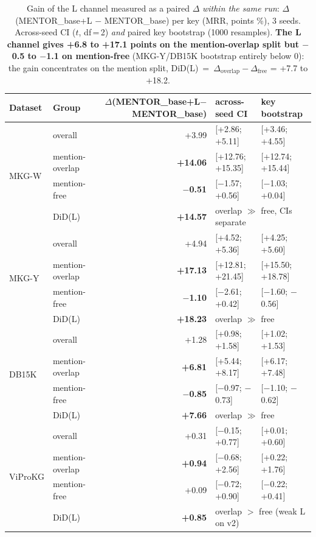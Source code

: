 \begin{table}[t]
\centering
\footnotesize
\setlength{\tabcolsep}{4pt}
\caption{Gain of the L channel measured as a paired $\Delta$ \emph{within the same run}: $\Delta$(MENTOR\_base+L $-$ MENTOR\_base) per key (MRR, points \%), 3 seeds. Across-seed CI ($t$, df\,=\,2) \emph{and} paired key bootstrap (1000 resamples). \textbf{The L channel gives +6.8 to +17.1 points on the mention-overlap split but $-$0.5 to $-$1.1 on mention-free} (MKG-Y/DB15K bootstrap entirely below 0): the gain concentrates on the mention split, DiD(L)~=~$\Delta_{\text{overlap}}-\Delta_{\text{free}}$ = +7.7 to +18.2.}
\label{tab:delta_L}
\begin{tabular}{l l r l l}
\toprule
Dataset & Group & $\Delta$(MENTOR\_base+L$-$MENTOR\_base) & across-seed CI & key bootstrap \\
\midrule
\multirow{4}{*}{MKG-W} & overall & +3.99 & [+2.86; +5.11] & [+3.46; +4.55] \\
 & mention-overlap & \textbf{+14.06} & [+12.76; +15.35] & [+12.74; +15.44] \\
 & mention-free & \textbf{$-$0.51} & [$-$1.57; +0.56] & [$-$1.03; +0.04] \\
 & DiD(L) & \textbf{+14.57} & \multicolumn{2}{l}{overlap $\gg$ free, CIs separate} \\
\midrule
\multirow{4}{*}{MKG-Y} & overall & +4.94 & [+4.52; +5.36] & [+4.25; +5.60] \\
 & mention-overlap & \textbf{+17.13} & [+12.81; +21.45] & [+15.50; +18.78] \\
 & mention-free & \textbf{$-$1.10} & [$-$2.61; +0.42] & [$-$1.60; $-$0.56] \\
 & DiD(L) & \textbf{+18.23} & \multicolumn{2}{l}{overlap $\gg$ free} \\
\midrule
\multirow{4}{*}{DB15K} & overall & +1.28 & [+0.98; +1.58] & [+1.02; +1.53] \\
 & mention-overlap & \textbf{+6.81} & [+5.44; +8.17] & [+6.17; +7.48] \\
 & mention-free & \textbf{$-$0.85} & [$-$0.97; $-$0.73] & [$-$1.10; $-$0.62] \\
 & DiD(L) & \textbf{+7.66} & \multicolumn{2}{l}{overlap $\gg$ free} \\
\midrule
\multirow{4}{*}{ViProKG} & overall & +0.31 & [$-$0.15; +0.77] & [+0.01; +0.60] \\
 & mention-overlap & \textbf{+0.94} & [$-$0.68; +2.56] & [+0.22; +1.76] \\
 & mention-free & +0.09 & [$-$0.72; +0.90] & [$-$0.22; +0.41] \\
 & DiD(L) & \textbf{+0.85} & \multicolumn{2}{l}{overlap $>$ free (weak L on v2)} \\
\bottomrule
\end{tabular}


\end{table}
